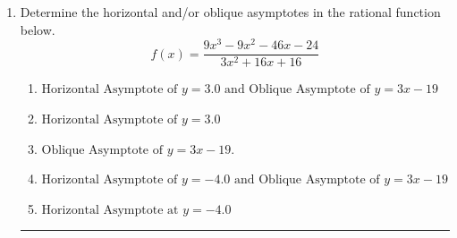 \documentclass[14pt]{extbook}
\newcommand{\litem}[1]{\item#1\hspace*{-1cm}\rule{\textwidth}{0.4pt}}
\begin{document}
\begin{enumerate}
{\begin{enumerate}[label=\Alph*.]
\end{enumerate} }
\litem{
Determine the horizontal and/or oblique asymptotes in the rational function below.\[ f(x) = \frac{9x^{3} -9 x^{2} -46 x -24}{3x^{2} +16 x + 16} \]\begin{enumerate}[label=\Alph*.]
\item \( \text{Horizontal Asymptote of } y = 3.0 \text{ and Oblique Asymptote of } y = 3x -19 \)
\item \( \text{Horizontal Asymptote of } y = 3.0  \)
\item \( \text{Oblique Asymptote of } y = 3x -19. \)
\item \( \text{Horizontal Asymptote of } y = -4.0 \text{ and Oblique Asymptote of } y = 3x -19 \)
\item \( \text{Horizontal Asymptote at } y = -4.0 \)

\end{enumerate} }
\end{enumerate}
\end{document}
